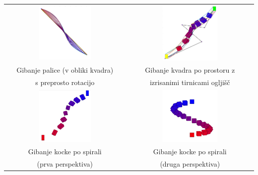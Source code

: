\documentclass[12pt,a4paper,twoside]{article}
\theoremstyle{definition} %
\theoremstyle{plain} %
\numberwithin{equation}{section}  %
\begin{document}
\begin{center}
\begin{tabular}{c c}
\includegraphics[width=0.45\textwidth]{slika1(dnkoblike)}
&
\includegraphics[width=0.45\textwidth]{slika2(tirnice)}
\\
Gibanje palice (v obliki kvadra) & Gibanje kvadra po prostoru z\\
s preprosto rotacijo & izrisanimi tirnicami ogljišč \\
\includegraphics[width=0.45\textwidth]{slika3}
&
\includegraphics[width=0.45\textwidth]{slika4}
\\
Gibanje kocke po spirali & Gibanje kocke po spirali \\
(prva perspektiva) & (druga perspektiva) \\
\end{tabular}
\end{center}
\end{document}
